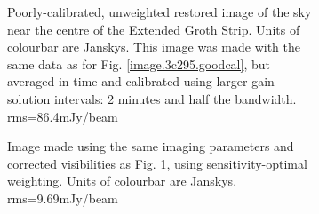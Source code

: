 \begin{figure}[h!]
\begin{subfigure}{.49\textwidth}
\caption{\label{image.3c295.nocorr} Poorly-calibrated, unweighted restored image of the sky near the centre of the Extended Groth Strip. {Units of colourbar are Janskys}. This image was made with the same data as for Fig. \ref{image.3c295.goodcal}, but averaged in time and calibrated using larger gain solution intervals: 2 minutes and half the bandwidth. rms=86.4mJy/beam}
\end{subfigure}
\hfill
\begin{subfigure}{.49\textwidth}
\caption{\label{image.3c295.lightcorr} Image made using the same imaging parameters and corrected visibilities as Fig. \ref{image.3c295.nocorr}, using sensitivity-optimal weighting. {Units of colourbar are Janskys}. rms=9.69mJy/beam}
\end{subfigure}
\hfill
\begin{subfigure}{.49\textwidth}

\end{subfigure}
\end{figure}
